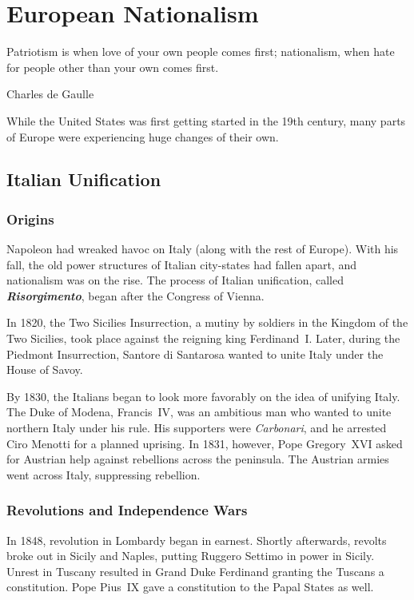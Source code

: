 \chapter{European Nationalism}

\epigraph{%
  Patriotism is when love of your own people comes first;
  nationalism, when hate for people other than your own comes first.
}{Charles de Gaulle}

While the United States was first getting started in the 19th century,
many parts of Europe were experiencing huge changes of their own.

\section{Italian Unification}

\subsection*{Origins}

Napoleon had wreaked havoc on Italy (along with the rest of Europe).
With his fall, the old power structures of Italian city-states had fallen apart,
and nationalism was on the rise.
The process of Italian unification, called \textbf{\textit{Risorgimento}},
began after the Congress of Vienna.

In 1820, the Two Sicilies Insurrection, a mutiny by soldiers in the Kingdom of the Two Sicilies,
took place against the reigning king Ferdinand~I.
Later, during the Piedmont Insurrection,
Santore di Santarosa wanted to unite Italy under the House of Savoy.

By 1830, the Italians began to look more favorably on the idea of unifying Italy.
The Duke of Modena, Francis~IV,
was an ambitious man who wanted to unite northern Italy under his rule.
His supporters were \textit{Carbonari}, and he arrested Ciro Menotti for a planned uprising.
In 1831, however, Pope Gregory~XVI asked for Austrian help against rebellions across the peninsula.
The Austrian armies went across Italy, suppressing rebellion.

\subsection*{Revolutions and Independence Wars}

In 1848, revolution in Lombardy began in earnest.
Shortly afterwards,
revolts broke out in Sicily and Naples, putting Ruggero Settimo in power in Sicily.
Unrest in Tuscany resulted in Grand Duke Ferdinand granting the Tuscans a constitution.
Pope Pius~IX gave a constitution to the Papal States as well.

